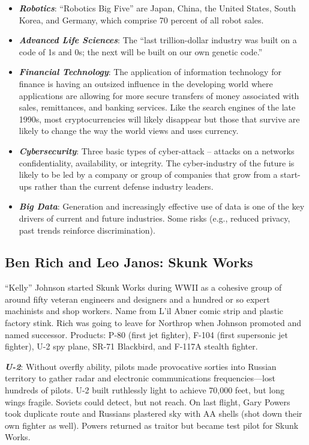 \documentclass[
]{article}
\begin{document}
\begin{itemize}
\item
  \textbf{\emph{Robotics}}: ``Robotics Big Five'' are Japan, China, the
  United States, South Korea, and Germany, which comprise 70 percent of
  all robot sales.
\item
  \textbf{\emph{Advanced Life Sciences}}: The ``last trillion-dollar
  industry was built on a code of 1s and 0s; the next will be built on
  our own genetic code.''
\item
  \textbf{\emph{Financial Technology}}: The application of information
  technology for finance is having an outsized influence in the
  developing world where applications are allowing for more secure
  transfers of money associated with sales, remittances, and banking
  services. Like the search engines of the late 1990s, most
  cryptocurrencies will likely disappear but those that survive are
  likely to change the way the world views and uses currency.
\item
  \textbf{\emph{Cybersecurity}}: Three basic types of cyber-attack --
  attacks on a networks confidentiality, availability, or integrity. The
  cyber-industry of the future is likely to be led by a company or group
  of companies that grow from a start-ups rather than the current
  defense industry leaders.
\item
  \textbf{\emph{Big Data}}: Generation and increasingly effective use of
  data is one of the key drivers of current and future industries. Some
  risks (e.g., reduced privacy, past trends reinforce discrimination).
\end{itemize}

\hypertarget{ben-rich-and-leo-janos-skunk-works}{%
\subsection{Ben Rich and Leo Janos: Skunk
Works}\label{ben-rich-and-leo-janos-skunk-works}}

``Kelly'' Johnson started Skunk Works during WWII as a cohesive group of
around fifty veteran engineers and designers and a hundred or so expert
machinists and shop workers. Name from L'il Abner comic strip and
plastic factory stink. Rich was going to leave for Northrop when Johnson
promoted and named successor. Products: P-80 (first jet fighter), F-104
(first supersonic jet fighter), U-2 spy plane, SR-71 Blackbird, and
F-117A stealth fighter.

\textbf{\emph{U-2}}: Without overfly ability, pilots made provocative
sorties into Russian territory to gather radar and electronic
communications frequencies---lost hundreds of pilots. U-2 built
ruthlessly light to achieve 70,000 feet, but long wings fragile. Soviets
could detect, but not reach. On last flight, Gary Powers took duplicate
route and Russians plastered sky with AA shells (shot down their own
fighter as well). Powers returned as traitor but became test pilot for
Skunk Works.
\end{document}
